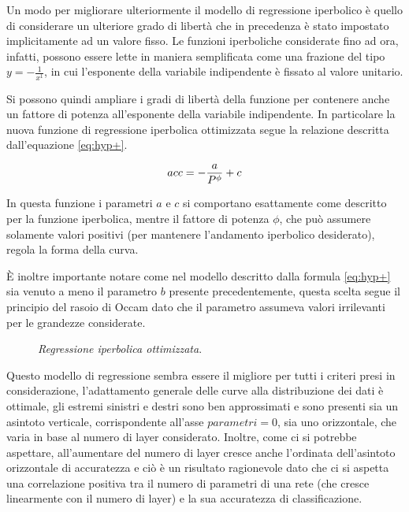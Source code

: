 Un modo per migliorare ulteriormente il modello di regressione iperbolico è quello di considerare un ulteriore grado di libertà che in precedenza è stato impostato implicitamente ad un valore fisso. Le funzioni iperboliche considerate fino ad ora, infatti, possono essere lette in maniera semplificata come una frazione del tipo $y= -\frac{1}{x^{1}}$, in cui l'esponente della variabile indipendente è fissato al valore unitario. 

Si possono quindi ampliare i gradi di libertà della funzione per contenere anche un fattore di potenza all'esponente della variabile indipendente. In particolare la nuova funzione di regressione iperbolica ottimizzata segue la relazione descritta dall'equazione \ref{eq:hyp+}.

\begin{equation}
\label{eq:hyp+}
    \centering
    acc = -\frac{a}{P^{\phi}} + c
\end{equation}

In questa funzione i parametri $a$ e $c$ si comportano esattamente come descritto per la funzione iperbolica, mentre il fattore di potenza $\phi$, che può assumere solamente valori positivi (per mantenere l'andamento iperbolico desiderato), regola la forma della curva. 

È inoltre importante notare come nel modello descritto dalla formula \ref{eq:hyp+} sia venuto a meno il parametro $b$ presente precedentemente, questa scelta segue il principio del rasoio di Occam dato che il parametro assumeva valori irrilevanti per le grandezze considerate.

\begin{figure}[ht]
    \centering
    \quad
    \quad
    \caption{\textit{Regressione iperbolica ottimizzata}.}
    \label{fig:hyp+_reg}
\end{figure}

Questo modello di regressione sembra essere il migliore per tutti i criteri presi in considerazione, l'adattamento generale delle curve alla distribuzione dei dati è ottimale, gli estremi sinistri e destri sono ben approssimati e sono presenti sia un asintoto verticale, corrispondente all'asse $parametri=0$, sia uno orizzontale, che varia in base al numero di layer considerato. Inoltre, come ci si potrebbe aspettare, all'aumentare del numero di layer cresce anche l'ordinata dell'asintoto orizzontale di accuratezza e ciò è un risultato ragionevole dato che ci si aspetta una correlazione positiva tra il numero di parametri di una rete (che cresce linearmente con il numero di layer) e la sua accuratezza di classificazione.

